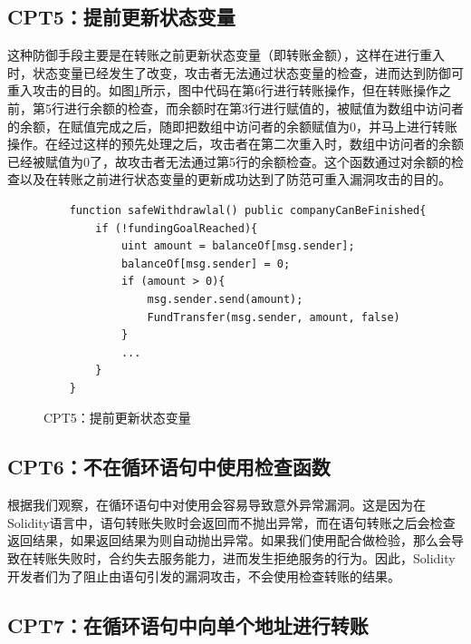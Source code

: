 \subsection{CPT5：提前更新状态变量}
这种防御手段主要是在转账之前更新状态变量（即转账金额），这样在进行重入时，状态变量已经发生了改变，攻击者无法通过状态变量的检查，进而达到防御可重入攻击的目的。如图\ref{fig:ss5_example}所示，图中代码在第6行进行转账操作，但在转账操作之前，第5行进行余额的检查，而余额时在第3行进行赋值的，被赋值为数组中访问者的余额，在赋值完成之后，随即把数组中访问者的余额赋值为0，并马上进行转账操作。在经过这样的预先处理之后，攻击者在第二次重入时，数组中访问者的余额已经被赋值为0了，故攻击者无法通过第5行的余额检查。这个函数通过对余额的检查以及在转账之前进行状态变量的更新成功达到了防范可重入漏洞攻击的目的。
\begin{figure}
\begin{minipage}[htbp]{1.0\linewidth}
    \begin{lstlisting}
    function safeWithdrawlal() public companyCanBeFinished{
        if (!fundingGoalReached){
            uint amount = balanceOf[msg.sender];
            balanceOf[msg.sender] = 0;
            if (amount > 0){
                msg.sender.send(amount);
                FundTransfer(msg.sender, amount, false)
            }
            ...
        }
    }
    \end{lstlisting}
\end{minipage}
\vspace{-5mm}
\caption{CPT5：提前更新状态变量}
\label{fig:ss5_example}
\end{figure}

\subsection{CPT6：不在循环语句中使用检查函数}\label{sec:ss6}

根据我们观察，在循环语句中对使用会容易导致意外异常漏洞。这是因为在Solidity语言中，语句转账失败时会返回而不抛出异常，而在语句转账之后会检查返回结果，如果返回结果为则自动抛出异常。如果我们使用配合做检验，那么会导致在转账失败时，合约失去服务能力，进而发生拒绝服务的行为。因此，Solidity开发者们为了阻止由语句引发的漏洞攻击，不会使用检查转账的结果。

\subsection{CPT7：在循环语句中向单个地址进行转账}\label{sec:ss7}

